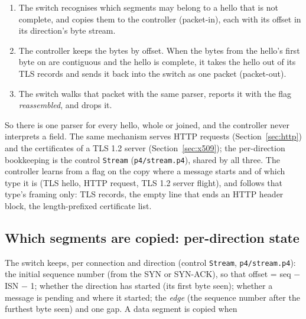 \documentclass[11pt,a4paper]{article}
\newcommand{\code}[1]{\texttt{#1}}
\begin{document}
\begin{enumerate}
\item The switch recognises which segments may belong to a hello that is not complete, and copies them to the
  controller (packet-in), each with its offset in its direction's byte stream.
\item The controller keeps the bytes by offset. When the bytes from the hello's first byte on are contiguous and the
  hello is complete, it takes the hello out of its TLS records and sends it back into the switch as one packet
  (packet-out).
\item The switch walks that packet with the same parser, reports it with the flag \emph{reassembled}, and drops it.
\end{enumerate}
So there is one parser for every hello, whole or joined, and the controller never interprets a field. The same
mechanism serves HTTP requests (Section~\ref{sec:http}) and the certificates of a TLS 1.2 server
(Section~\ref{sec:x509}); the per-direction bookkeeping is the control \code{Stream} (\code{p4/stream.p4}), shared by
all three. The controller learns from a flag on the copy where a message starts and of which type it is (TLS hello,
HTTP request, TLS 1.2 server flight), and follows that type's framing only: TLS records, the empty line that ends an
HTTP header block, the length-prefixed certificate list.

\subsection{Which segments are copied: per-direction state}

The switch keeps, per connection and direction (control \code{Stream}, \code{p4/stream.p4}): the initial sequence
number (from the SYN or SYN-ACK), so that offset = seq $-$ ISN $-$ 1; whether the direction has started (its first
byte seen); whether a message is pending and where it started; the \emph{edge} (the sequence number after the
furthest byte seen) and one gap. A data segment is copied when
\end{document}
